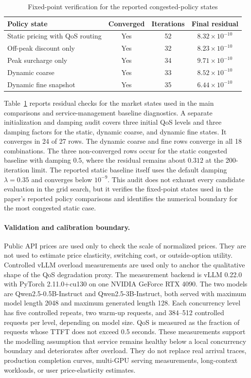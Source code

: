 \documentclass[11pt,a4paper]{article}
\begin{document}
\begin{table}[H]
\centering
\caption{Fixed-point verification for the reported congested-policy states}
\label{tab:fixed_point_verification}
\small
\begin{tabular}{lccc}
\toprule
Policy state & Converged & Iterations & Final residual \\
\midrule
Static pricing with QoS routing & Yes & 52 & $8.32\times10^{-10}$ \\
Off-peak discount only & Yes & 32 & $8.23\times10^{-10}$ \\
Peak surcharge only & Yes & 34 & $9.71\times10^{-10}$ \\
Dynamic coarse & Yes & 33 & $8.52\times10^{-10}$ \\
Dynamic fine snapshot & Yes & 35 & $6.44\times10^{-10}$ \\
\bottomrule
\end{tabular}
\end{table}

Table~\ref{tab:fixed_point_verification} reports residual checks for the market states used in the main comparisons and service-management baseline diagnostics. A separate initialization and damping audit covers three initial QoS levels and three damping factors for the static, dynamic coarse, and dynamic fine states. It converges in 24 of 27 rows. The dynamic coarse and fine rows converge in all 18 combinations. The three non-converged rows occur for the static congested baseline with damping $0.5$, where the residual remains about $0.312$ at the 200-iteration limit. The reported static baseline itself uses the default damping $\lambda=0.35$ and converges below $10^{-9}$. This audit does not exhaust every candidate evaluation in the grid search, but it verifies the fixed-point states used in the paper's reported policy comparisons and identifies the numerical boundary for the most congested static case.

\paragraph{Validation and calibration boundary.}

Public API prices are used only to check the scale of normalized prices. They are not used to estimate price elasticity, switching cost, or outside-option utility. Controlled vLLM overload measurements are used only to anchor the qualitative shape of the QoS degradation proxy. The measurement backend is vLLM 0.22.0 with PyTorch 2.11.0+cu130 on one NVIDIA GeForce RTX 4090. The two models are Qwen2.5-0.5B-Instruct and Qwen2.5-3B-Instruct, both served with maximum model length 2048 and maximum generated length 128. Each concurrency level has five controlled repeats, two warm-up requests, and 384--512 controlled requests per level, depending on model size. QoS is measured as the fraction of requests whose TTFT does not exceed 0.5 seconds. These measurements support the modelling assumption that service remains healthy below a local concurrency boundary and deteriorates after overload. They do not replace real arrival traces, production completion curves, multi-GPU serving measurements, long-context workloads, or user price-elasticity estimates.
\end{document}
